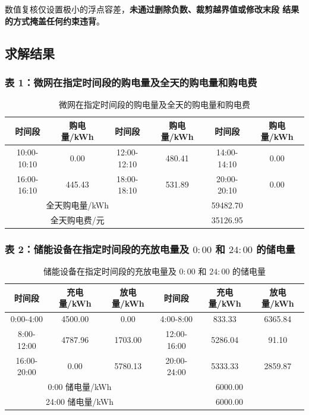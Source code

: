 \documentclass[withoutpreface,bwprint]{cumcmthesis}
\begin{document}
数值复核仅设置极小的浮点容差，\textbf{未通过删除负数、裁剪越界值或修改末段
结果的方式掩盖任何约束违背}。

\subsection{求解结果}

\subsubsection{表 1：微网在指定时间段的购电量及全天的购电量和购电费}

\begin{table}[H]
  \centering
  \caption{微网在指定时间段的购电量及全天的购电量和购电费}
  \label{tab:p1-buy}
  \begin{tabular}{cccccc}
    \toprule
    时间段 & 购电量/kWh & 时间段 & 购电量/kWh & 时间段 & 购电量/kWh \\
    \midrule
    10:00-10:10 & 0.00 & 12:00-12:10 & 480.41 & 14:00-14:10 & 0.00 \\
    16:00-16:10 & 445.43 & 18:00-18:10 & 531.89 & 20:00-20:10 & 0.00 \\
    \midrule
    \multicolumn{3}{c}{全天购电量/kWh} & \multicolumn{3}{c}{59482.70} \\
    \multicolumn{3}{c}{全天购电费/元}   & \multicolumn{3}{c}{35126.95} \\
    \bottomrule
  \end{tabular}
\end{table}

\subsubsection{表 2：储能设备在指定时间段的充放电量及 $0{:}00$ 和 $24{:}00$ 的储电量}

\begin{table}[H]
  \centering
  \caption{储能设备在指定时间段的充放电量及 $0{:}00$ 和 $24{:}00$ 的储电量}
  \label{tab:p1-storage}
  \begin{tabular}{cccccc}
    \toprule
    时间段 & 充电量/kWh & 放电量/kWh & 时间段 & 充电量/kWh & 放电量/kWh \\
    \midrule
    0:00-4:00   & 4500.00 & 0.00     & 4:00-8:00    & 833.33  & 6365.84 \\
    8:00-12:00  & 4787.96 & 1703.00  & 12:00-16:00  & 5286.04 & 91.10   \\
    16:00-20:00 & 0.00    & 5780.13  & 20:00-24:00  & 5333.33 & 2859.87 \\
    \midrule
    \multicolumn{3}{c}{0:00 储电量/kWh}  & \multicolumn{3}{c}{6000.00} \\
    \multicolumn{3}{c}{24:00 储电量/kWh} & \multicolumn{3}{c}{6000.00} \\
    \bottomrule
  \end{tabular}
\end{table}
\end{document}
